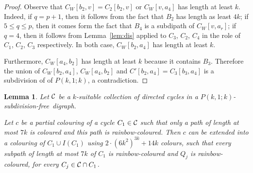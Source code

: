 \documentclass[utf8,10pt]{article}
\theoremstyle{plain}
\newtheorem{lemma}[theorem]{Lemma}
\theoremstyle{definition}
\theoremstyle{remark}
\newcommand{\col}{(6k^2)^{3k}}
\newcommand{\free}{subdivision-free}
\begin{document}
\begin{proof}
Observe that $C_W[b_2,v]=C_2[b_2,v]$ or $C_W[v, a_4]$ has length at least $k$.
Indeed, if $q=p+1$, then it follows from the fact that $B_2$ has length as least $4k$; if
$5\leq q\leq p$, then it comes form the fact that $B_4$ is a subdipath of $C_W[v, a_r]$; if $q=4$, then it follows from Lemma~\ref{lem:dis}  applied to $C_3$, $C_2$, $C_4$ in the role of $C_1$, $C_2$, $C_3$ respectively.
In both case, $C_W[b_2, a_4]$ has length at least $k$. 

Furthermore, $C_W[a_4,b_2]$ has length at least $k$ because it contains $B_3$. Therefore the union of
$C_W[b_2, a_4]$, $C_W[a_4,b_2]$ and $C'[b_2,a_4]=C_3[b_3,a_4]$ is a subdivision of of $P(k,1;k)$, a contradiction.
\end{proof}




\begin{lemma}\label{lem:IC}
Let ${\cal C}$ be a $k$-suitable collection of directed cycles in a $P(k,1;k)$-\free\ digraph.

Let $c$ be a partial colouring of a cycle $C_1\in {\cal C}$ such that only a path of length at most
$7k$ is coloured and this path is rainbow-coloured. Then $c$ can be extended into
a colouring of $C_1\cup I(C_1)$ using $2\cdot \col + 14k$ colours, such that every subpath of length at most $7k$ of $C_1$ is rainbow-coloured and  $Q_j$ is rainbow-coloured, for every $C_j\in {\cal C}\cap C_1$.\end{lemma}
\end{document}
